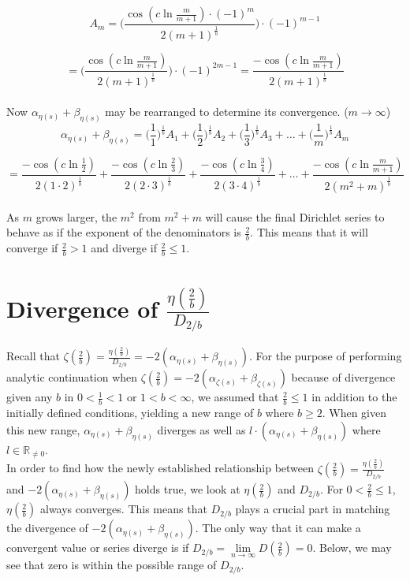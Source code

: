 \documentclass{amsart}
\begin{document}
	\[ A_m = \Biggl( \frac{\cos(c \ln \frac{m}{m+1}){\cdot}(-1)^{m}}{2(m+1)^{\frac{1}{b}}}  \Biggr) \cdot (-1)^{m-1} \]
	
	\[ = \Biggl( \frac{\cos(c \ln \frac{m}{m+1})}{2(m+1)^{\frac{1}{b}}}  \Biggr) \cdot (-1)^{2m-1} = \frac{-\cos(c \ln \frac{m}{m+1})}{2(m+1)^{\frac{1}{b}}} \]	
	\\
	Now $\alpha_{\eta(s)} + \beta_{\eta(s)}$ may be rearranged to determine its convergence. ($m \to \infty$)
	\[ \alpha_{\eta(s)} + \beta_{\eta(s)} = \Big(\frac{1}{1}\Big)^{\frac{1}{b}}A_1 + \Big(\frac{1}{2}\Big)^{\frac{1}{b}}A_2 + \Big(\frac{1}{3}\Big)^{\frac{1}{b}}A_3 + \dots + \Big(\frac{1}{m}\Big)^{\frac{1}{b}}A_m \]
	
	\[ = \frac{-\cos(c \ln \frac{1}{2})}{2(1{\cdot}2)^{\frac{1}{b}}} + \frac{-\cos(c \ln \frac{2}{3})}{2(2{\cdot}3)^{\frac{1}{b}}} + \frac{-\cos(c \ln \frac{3}{4})}{2(3{\cdot}4)^{\frac{1}{b}}} + \dots + \frac{-\cos(c \ln \frac{m}{m+1})}{2(m^2+m)^{\frac{1}{b}}} \]
	\\
	
	As $m$ grows larger, the $m^2$ from $m^2+m$ will cause the final Dirichlet series to behave as if the exponent of the denominators is $\frac{2}{b}$. This means that it will converge if $\frac{2}{b} > 1$ and diverge if $\frac{2}{b} \leq 1$. 
	
	\section{Divergence of $\frac{\eta(\frac{2}{b})}{D_{2/b}}$}
	Recall that $\zeta(\frac{2}{b}) = \frac{\eta( \frac{2}{b} )}{D_{2/b}} = -2(\alpha_{\eta(s)} + \beta_{\eta(s)}) $. For the purpose of performing analytic continuation when $\zeta(\frac{2}{b}) = -2(\alpha_{\zeta(s)} + \beta_{\zeta(s)})$ because of divergence given any $b$ in $0 < \frac{1}{b} < 1$ or $1 < b < \infty$, we assumed that $\frac{2}{b} \leq 1$ in addition to the initially defined conditions, yielding a new range of $b$ where $b \geq 2$. When given this new range, $\alpha_{\eta(s)} + \beta_{\eta(s)}$ diverges as well as $l {\cdot} (\alpha_{\eta(s)} + \beta_{\eta(s)})$ where $l \in \mathbb{R}_{\neq 0}$.
	\\
	
	In order to find how the newly established relationship between  $\zeta(\frac{2}{b}) = \frac{\eta( \frac{2}{b} )}{D_{2/b}}$ and $-2(\alpha_{\eta(s)} + \beta_{\eta(s)})$ holds true, we look at $\eta(\frac{2}{b})$ and $D_{2/b}$. For $0 < \frac{2}{b} \leq 1$, $\eta(\frac{2}{b})$ always converges. This means that $D_{2/b}$ plays a crucial part in matching the divergence of $-2(\alpha_{\eta(s)} + \beta_{\eta(s)})$. The only way that it can make a convergent value or series diverge is if $D_{2/b} {=} \lim\limits_{n \to \infty}D(\frac{2}{b}) {=} 0$. Below, we may see that zero is within the possible range of $D_{2/b}$.
	
\end{document}
